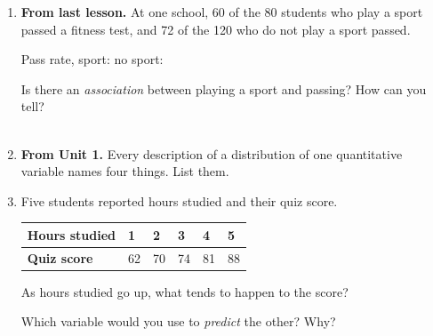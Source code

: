 \documentclass[12pt]{article}
\begin{document}

\vspace{0.28in}

\begin{enumerate}[leftmargin=1.9em, itemsep=0.75in]

  \item \textbf{From last lesson.} At one school, 60 of the 80 students who play a sport
        passed a fitness test, and 72 of the 120 who do not play a sport passed.

        \vspace{12pt}
        Pass rate, sport:  \qquad no sport: 
        \vspace{16pt}

        Is there an \emph{association} between playing a sport and passing? How can you
        tell?\\[18pt]
        \\[1pt]

  \item \textbf{From Unit 1.} Every description of a distribution of one quantitative
        variable names four things. List them.

        \vspace{16pt}
         \quad {} \quad {} \quad

  \item Five students reported hours studied and their quiz score.

        \vspace{12pt}
        \renewcommand{\arraystretch}{1.5}
        \begin{tabularx}{\linewidth}{@{} l Y Y Y Y Y @{}}
        \textbf{Hours studied} & 1 & 2 & 3 & 4 & 5 \\
        \hline
        \textbf{Quiz score} & 62 & 70 & 74 & 81 & 88 \\
        \end{tabularx}

        \vspace{16pt}
        As hours studied go up, what tends to happen to the score? 
        \vspace{16pt}

        Which variable would you use to \emph{predict} the other? Why?\\[18pt]
        \\[1pt]

\end{enumerate}
\end{document}
